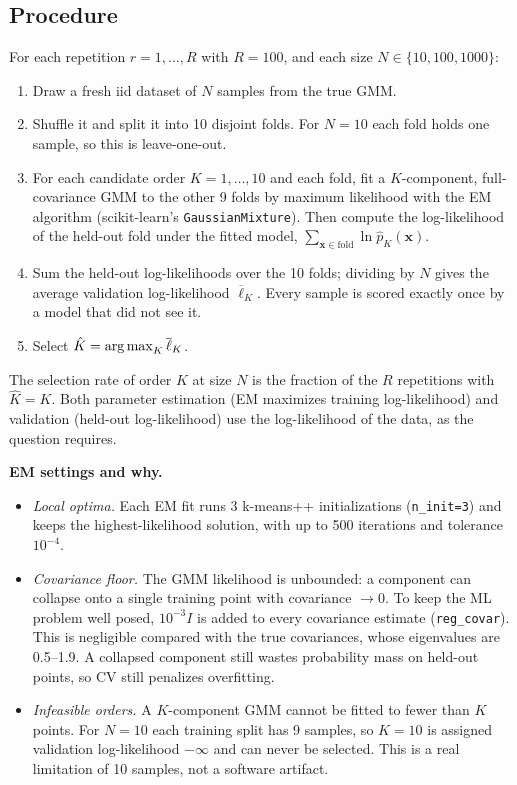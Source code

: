 \documentclass[11pt]{article}
\newcommand{\x}{{\mathbf{x}}}
\begin{document}
\subsection*{Procedure}
For each repetition $r=1,\dots,R$ with $R=100$, and each size $N\in\{10,100,1000\}$:
\begin{enumerate}
\item Draw a fresh iid dataset of $N$ samples from the true GMM.
\item Shuffle it and split it into 10 disjoint folds. For $N=10$ each fold holds one sample, so this is leave-one-out.
\item For each candidate order $K=1,\dots,10$ and each fold, fit a $K$-component, full-covariance GMM to the other 9 folds by maximum likelihood with the EM algorithm (scikit-learn's \texttt{GaussianMixture}). Then compute the log-likelihood of the held-out fold under the fitted model, $\sum_{\x\in\text{fold}}\ln\hat p_K(\x)$.
\item Sum the held-out log-likelihoods over the 10 folds; dividing by $N$ gives the average validation log-likelihood $\overline{\ell}_K$. Every sample is scored exactly once by a model that did not see it.
\item Select $\hat K=\operatorname*{arg\,max}_K\overline{\ell}_K$.
\end{enumerate}
The selection rate of order $K$ at size $N$ is the fraction of the $R$ repetitions with $\hat K=K$. Both parameter estimation (EM maximizes training log-likelihood) and validation (held-out log-likelihood) use the log-likelihood of the data, as the question requires.

\textbf{EM settings and why.}
\begin{itemize}
\item \emph{Local optima.} Each EM fit runs 3 k-means++ initializations (\texttt{n\_init=3}) and keeps the highest-likelihood solution, with up to 500 iterations and tolerance $10^{-4}$.
\item \emph{Covariance floor.} The GMM likelihood is unbounded: a component can collapse onto a single training point with covariance $\to0$. To keep the ML problem well posed, $10^{-3}I$ is added to every covariance estimate (\texttt{reg\_covar}). This is negligible compared with the true covariances, whose eigenvalues are 0.5--1.9. A collapsed component still wastes probability mass on held-out points, so CV still penalizes overfitting.
\item \emph{Infeasible orders.} A $K$-component GMM cannot be fitted to fewer than $K$ points. For $N=10$ each training split has 9 samples, so $K=10$ is assigned validation log-likelihood $-\infty$ and can never be selected. This is a real limitation of 10 samples, not a software artifact.
\end{itemize}
\end{document}
